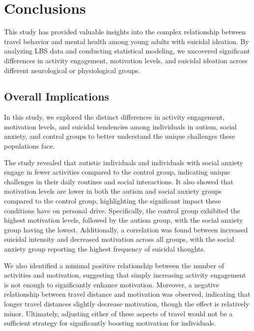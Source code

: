 \documentclass[
  letterpaper,
  number,
  review,
  3p]{elsarticle}
\begin{document}

\section{Conclusions}\label{conclusions}

This study has provided valuable insights into the complex relationship
between travel behavior and mental health among young adults with
suicidal ideation. By analyzing LBS data and conducting statistical
modeling, we uncovered significant differences in activity engagement,
motivation levels, and suicidal ideation across different neurological
or physiological groups.

\subsection{Overall Implications}\label{overall-implications}

In this study, we explored the distinct differences in activity
engagement, motivation levels, and suicidal tendencies among individuals
in autism, social anxiety, and control groups to better understand the
unique challenges these populations face.

The study revealed that autistic individuals and individuals with social
anxiety engage in fewer activities compared to the control group,
indicating unique challenges in their daily routines and social
interactions. It also showed that motivation levels are lower in both
the autism and social anxiety groups compared to the control group,
highlighting the significant impact these conditions have on personal
drive. Specifically, the control group exhibited the highest motivation
levels, followed by the autism group, with the social anxiety group
having the lowest. Additionally, a correlation was found between
increased suicidal intensity and decreased motivation across all groups,
with the social anxiety group reporting the highest frequency of
suicidal thoughts.

We also identified a minimal positive relationship between the number of
activities and motivation, suggesting that simply increasing activity
engagement is not enough to significantly enhance motivation. Moreover,
a negative relationship between travel distance and motivation was
observed, indicating that longer travel distances slightly decrease
motivation, though the effect is relatively minor. Ultimately, adjusting
either of these aspects of travel would not be a sufficient strategy for
significantly boosting motivation for individuals.
\end{document}
